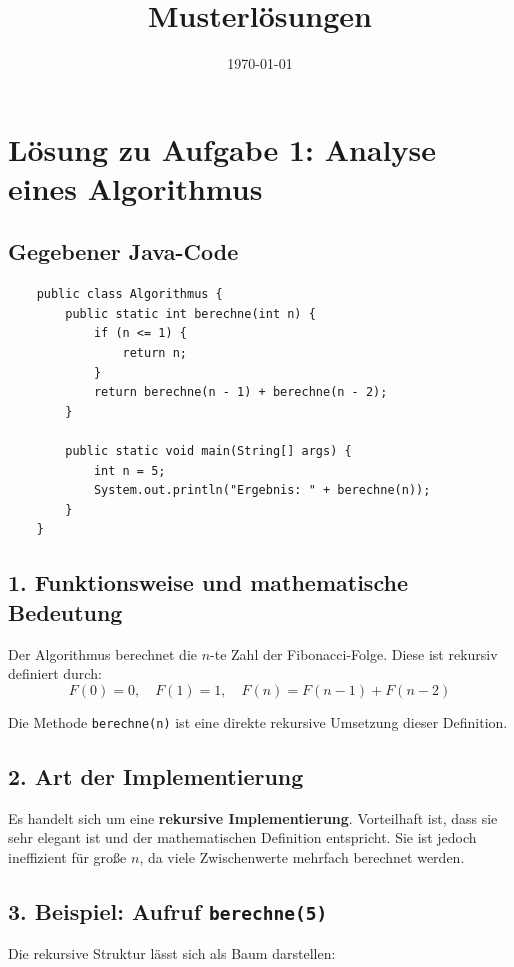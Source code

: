 \documentclass[a4paper,12pt]{article}
\begin{document}
	
	\title{\textbf{Musterlösungen}}
	\date{\today}
	\maketitle
	
	\section*{Lösung zu Aufgabe 1: Analyse eines Algorithmus}
	\subsection*{Gegebener Java-Code}

\begin{verbatim}
	public class Algorithmus {
		public static int berechne(int n) {
			if (n <= 1) {
				return n;
			}
			return berechne(n - 1) + berechne(n - 2);
		}
		
		public static void main(String[] args) {
			int n = 5;
			System.out.println("Ergebnis: " + berechne(n));
		}
	}
\end{verbatim}
		
		\subsection*{1. Funktionsweise und mathematische Bedeutung}
		
		Der Algorithmus berechnet die $n$-te Zahl der Fibonacci-Folge. Diese ist rekursiv definiert durch:
		\[
		F(0) = 0,\quad F(1) = 1,\quad F(n) = F(n - 1) + F(n - 2)
		\]
		
		Die Methode \texttt{berechne(n)} ist eine direkte rekursive Umsetzung dieser Definition.
		
		\subsection*{2. Art der Implementierung}
		
		Es handelt sich um eine \textbf{rekursive Implementierung}. Vorteilhaft ist, dass sie sehr elegant ist und der mathematischen Definition entspricht. Sie ist jedoch ineffizient für große $n$, da viele Zwischenwerte mehrfach berechnet werden.
		
		\subsection*{3. Beispiel: Aufruf \texttt{berechne(5)}}
		
		Die rekursive Struktur lässt sich als Baum darstellen:
\end{document}
